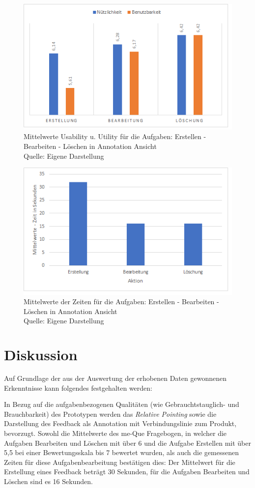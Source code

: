 \begin{figure}[H]
	\centering
	\includegraphics[width=.8\textwidth]{resources/evaluation/MittelWerteUsability.png}
	\caption{Mittelwerte Usability u. Utility für die Aufgaben: Erstellen - Bearbeiten - Löschen in Annotation Ansicht \\Quelle: Eigene Darstellung}
	\label{img:mwUsability}
\end{figure}

\begin{figure}[H]
	\centering
	\includegraphics[width=.8\textwidth]{resources/evaluation/mittelwerte_alle_aktionen.png}
	\caption{Mittelwerte der Zeiten für die Aufgaben: Erstellen - Bearbeiten - Löschen in Annotation Ansicht \\Quelle: Eigene Darstellung}
	\label{img:mwTimes}
\end{figure}

\section{Diskussion}

Auf Grundlage der aus der Auswertung der erhobenen Daten gewonnenen Erkenntnisse kann folgendes festgehalten werden:

In Bezug auf die aufgabenbezogenen Qualitäten (wie Gebrauchtstauglich- und Brauchbarkeit) des Prototypen werden das \textit{Relative Pointing} sowie die Darstellung des Feedback als Annotation mit Verbindungslinie zum Produkt, bevorzugt. Sowohl die Mittelwerte des me-Que Fragebogen, in welcher die Aufgaben Bearbeiten und Löschen mit über 6 und die Aufgabe Erstellen mit über 5,5 bei einer Bewertungsskala bis 7 bewertet wurden, als auch die gemessenen Zeiten für diese Aufgabenbearbeitung bestätigen dies: Der Mittelwert für die Erstellung eines Feedback beträgt 30 Sekunden, für die Aufgaben Bearbeiten und Löschen sind es 16 Sekunden.

